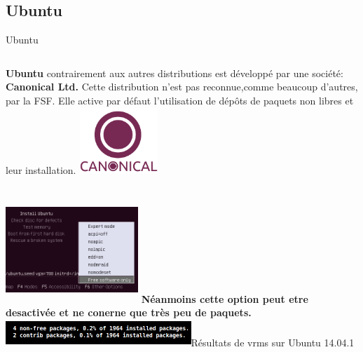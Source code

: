 \subsection{Ubuntu}
\begin{frame}[t,fragile]{Ubuntu}
    \fontsize{8}{10}\selectfont
    \begin{columns}
                \textbf{Ubuntu} contrairement aux autres distributions est développé par une société: \textbf{Canonical Ltd.} \linebreak
Cette distribution n’est pas reconnue,comme beaucoup d’autres, par la FSF. Elle active par défaut l’utilisation de dépôts de paquets non libres et leur installation.
            \centering \includegraphics[height=2.5cm, width=3cm]{Canonical-logo}
    \end{columns} \pause
    \begin{columns}
            \centering \includegraphics[height=4cm, width=5cm]{Ubuntu-foo}
            \textbf{Néanmoins cette option peut etre desactivée et ne conerne que très peu de paquets.}\linebreak \pause
            \centering \includegraphics[height=1cm, width=7cm]{vrms}\linebreak Résultats de vrms sur Ubuntu 14.04.1
    \end{columns}
\end{frame}

